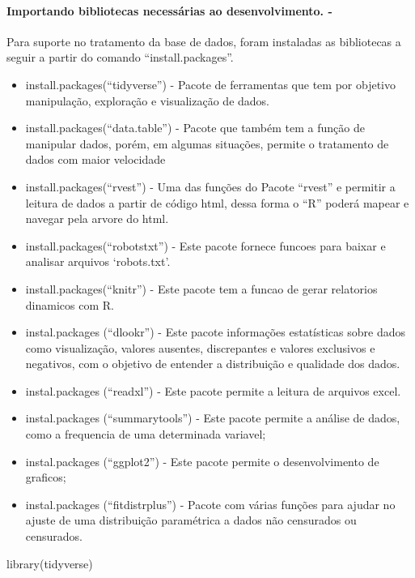 \documentclass[
]{article}
\newenvironment{Shaded}{\begin{snugshade}}{\end{snugshade}}
\newcommand{\FunctionTok}[1]{\textcolor[rgb]{0.00,0.00,0.00}{#1}}
\newcommand{\NormalTok}[1]{#1}
\begin{document}
\hypertarget{importando-bibliotecas-necessuxe1rias-ao-desenvolvimento.--}{%
\paragraph{Importando bibliotecas necessárias ao desenvolvimento. -}\label{importando-bibliotecas-necessuxe1rias-ao-desenvolvimento.--}}

Para suporte no tratamento da base de dados, foram instaladas as bibliotecas a seguir a partir do comando ``install.packages''.

\begin{itemize}
\item
  install.packages(``tidyverse'') - Pacote de ferramentas que tem por objetivo manipulação, exploração e visualização de dados.
\item
  install.packages(``data.table'') - Pacote que também tem a função de manipular dados, porém, em algumas situações, permite o tratamento de dados com maior velocidade
\item
  install.packages(``rvest'') - Uma das funções do Pacote ``rvest'' e permitir a leitura de dados a partir de código html, dessa forma o ``R'' poderá mapear e navegar pela arvore do html.
\item
  install.packages(``robotstxt'') - Este pacote fornece funcoes para baixar e analisar arquivos `robots.txt'.
\item
  install.packages(``knitr'') - Este pacote tem a funcao de gerar relatorios dinamicos com R.
\item
  instal.packages (``dlookr'') - Este pacote informações estatísticas sobre dados como visualização, valores ausentes, discrepantes e valores exclusivos e negativos, com o objetivo de entender a distribuição e qualidade dos dados.
\item
  instal.packages (``readxl'') - Este pacote permite a leitura de arquivos excel.
\item
  instal.packages (``summarytools'') - Este pacote permite a análise de dados, como a frequencia de uma determinada variavel;
\item
  instal.packages (``ggplot2'') - Este pacote permite o desenvolvimento de graficos;
\item
  instal.packages (``fitdistrplus'') - Pacote com várias funções para ajudar no ajuste de uma distribuição paramétrica a dados não censurados ou censurados.
\end{itemize}

\begin{Shaded}
\begin{Highlighting}[]
\FunctionTok{library}\NormalTok{(tidyverse)}
\end{Highlighting}
\end{Shaded}
\end{document}
